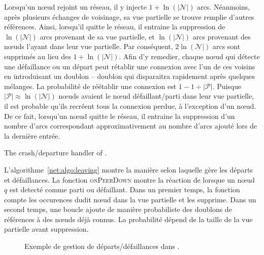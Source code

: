 Lorsqu'un nœud rejoint un réseau, il y injecte $1+\ln(|\mathcal{N}|)$
arcs. Néanmoins, après plusieurs échanges de voisinage, sa vue partielle se
trouve remplie d'autres références. Ainsi, lorsqu'il quitte le réseau, il
entraine la suppression de $\ln(|\mathcal{N}|)$ arcs provenant de sa vue
partielle, et $\ln(|\mathcal{N}|)$ arcs provenant des nœuds l'ayant dans leur
vue partielle. Par conséquent, $2\ln(\mathcal{N}|)$ arcs sont supprimés au lieu
des $1+\ln(|\mathcal{N}|)$. Afin d'y remedier, chaque nœud qui détecte une
défaillance ou un départ peut rétablir une connexion avec l'un de ces voisins en
introduisant un doublon -- doublon qui disparaitra rapidement après quelques
mélanges. La probabilité de réétablir une connexion est
$1-1\div{|\mathcal{P}|}$. Puisque ${|\mathcal{P}|}\approx \ln(|\mathcal{N}|)$
nœuds avaient le nœud défaillant/parti dans leur vue partielle, il est probable
qu'ils recréent tous la connexion perdue, à l'exception d'un nœud. De ce fait,
lorsqu'un nœud quitte le réseau, il entraine la suppression d'un nombre d'arcs
correspondant approximativement au nombre d'arcs ajouté lors de la dernière
entrée.

\begin{algorithm}[h]
  
  \caption{\label{net:algo:leaving}The crash/departure handler of \SPRAY.}
\end{algorithm}

L'algorithme~\ref{net:algo:leaving} montre la manière selon laquelle \SPRAY gère
les départs et défaillances. La fonction \textsc{onPeerDown} montre la réaction
de \SPRAY lorsque un nœud $q$ est detecté comme parti ou défaillant. Dans un
premier temps, la fonction compte les occurences dudit nœud dans la vue
partielle et les supprime. Dans un second temps, une boucle ajoute de manière
probabiliste des doublons de références à des nœuds déjà connus. La probabilité
dépend de la taille de la vue partielle avant suppression.

\begin{figure*}
  \centering
  \hspace{40pt}
  \hspace{40pt}
  \caption{\label{net:fig:leavingexample}Exemple de gestion de
    départs/défaillances dans \SPRAY.}
\end{figure*}

